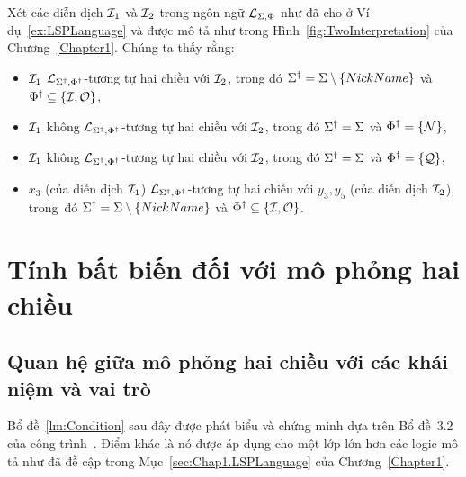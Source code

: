 \begin{Example}
	Xét các diễn dịch $\mathcal{I}_1$ và $\mathcal{I}_2$ trong ngôn ngữ $\mathcal{L}_{\Sigma,\Phi}$ như đã cho ở Ví dụ~\ref{ex:LSPLanguage} và được mô tả như trong Hình~\ref{fig:TwoInterpretation} của Chương~\ref{Chapter1}. Chúng ta thấy rằng:	
	\begin{itemize}
		\item $\mathcal{I}_1$ $\mathcal{L}_{\Sigma^\dag,\Phi^\dag}$-tương tự hai chiều với $\mathcal{I}_2$, trong đó $\Sigma^\dag = \Sigma \setminus \{NickName\}$ và\break $\Phi^\dag \subseteq \{\mathcal{I}, \mathcal{O}\}$,
		\item $\mathcal{I}_1$ không $\mathcal{L}_{\Sigma^\dag,\Phi^\dag}$-tương tự hai chiều với $\mathcal{I}_2$, trong đó $\Sigma^\dag = \Sigma$ và $\Phi^\dag = \{\mathcal{N}\}$,
		\item $\mathcal{I}_1$ không $\mathcal{L}_{\Sigma^\dag,\Phi^\dag}$-tương tự hai chiều với $\mathcal{I}_2$, trong đó $\Sigma^\dag = \Sigma$ và $\Phi^\dag = \{\mathcal{Q}\}$,
		\item $x_3$ (của diễn dịch $\mathcal{I}_1$) $\mathcal{L}_{\Sigma^\dag,\Phi^\dag}$-tương tự hai chiều với $y_3, y_5$ (của diễn dịch $\mathcal{I}_2$), trong~đó $\Sigma^\dag = \Sigma \setminus \{NickName\}$ và $\Phi^\dag \subseteq \{\mathcal{I}, \mathcal{O}\}$.\myend
	\end{itemize}
\end{Example}

\section{Tính bất biến đối với mô phỏng hai chiều}
\label{sec:Chap2.Invariant}
\subsection{Quan hệ giữa mô phỏng hai chiều với các khái niệm và vai trò}
\label{sec:Chap2.BisConceptRole}
Bổ đề~\ref{lm:Condition} sau đây được phát biểu và chứng minh dựa trên Bổ đề~3.2 của công trình~\cite{Divroodi2011B}. Điểm khác là nó được áp dụng cho một lớp lớn hơn các logic mô tả như đã đề cập trong Mục~\ref{sec:Chap1.LSPLanguage} của Chương~\ref{Chapter1}.

